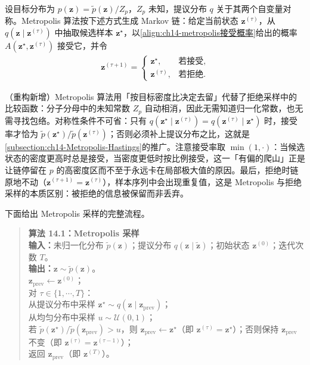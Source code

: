 \documentclass[../../main.tex]{subfiles}
\begin{document}
\begin{definition}[Metropolis 算法]\label{definition:ch14-Metropolis算法}
设目标分布为 $p(\bm{z})=\widetilde{p}(\bm{z})/Z_{p}$，$Z_{p}$ 未知，提议分布 $q$ 关于其两个自变量对称。Metropolis 算法按下述方式生成 Markov 链：给定当前状态 $\bm{z}^{(\tau)}$，从 $q\!\left(\bm{z}\mid\bm{z}^{(\tau)}\right)$ 中抽取候选样本 $\bm{z}^{\star}$，以\eqref{align:ch14-metropolis接受概率}给出的概率 $A\!\left(\bm{z}^{\star},\bm{z}^{(\tau)}\right)$ 接受它，并令
\begin{align*}
\bm{z}^{(\tau+1)}=\begin{cases}\bm{z}^{\star}, & \text{若接受},\\ \bm{z}^{(\tau)}, & \text{若拒绝}.\end{cases}
\end{align*}
\end{definition}

\begin{remark}（重构新增）Metropolis 算法用「按目标密度比决定去留」代替了拒绝采样中的比较函数：分子分母中的未知常数 $Z_{p}$ 自动相消，因此无需知道归一化常数，也无需寻找包络。对称性条件不可省：只有 $q\!\left(\bm{z}^{\star}\mid\bm{z}^{(\tau)}\right)=q\!\left(\bm{z}^{(\tau)}\mid\bm{z}^{\star}\right)$ 时，接受率才恰为 $\widetilde{p}(\bm{z}^{\star})/\widetilde{p}(\bm{z}^{(\tau)})$；否则必须补上提议分布之比，这就是\cref{subsection:ch14-Metropolis-Hastings}的推广。注意接受率取 $\min(1,\cdot)$：当候选状态的密度更高时总是接受，当密度更低时按比例接受，这一「有偏的爬山」正是让链停留在 $p$ 的高密度区而不至于永远卡在局部极大值的原因。最后，拒绝时链原地不动（$\bm{z}^{(\tau+1)}=\bm{z}^{(\tau)}$），样本序列中会出现重复值，这是 Metropolis 与拒绝采样的本质区别：被拒绝的信息被保留而非丢弃。
\end{remark}

下面给出 Metropolis 采样的完整流程。

\begin{quote}
\small
\textbf{算法 14.1：Metropolis 采样}\\
\textbf{输入：}未归一化分布 $\widetilde{p}(\bm{z})$；提议分布 $q\!\left(\bm{z}\mid\widetilde{\bm{z}}\right)$；初始状态 $\bm{z}^{(0)}$；迭代次数 $T$。\\
\textbf{输出：}$\bm{z}\sim\widetilde{p}(\bm{z})$。\\
$\bm{z}_{\mathrm{prev}}\leftarrow\bm{z}^{(0)}$；\\
对 $\tau\in\{1,\cdots,T\}$：\\
\quad 从提议分布中采样 $\bm{z}^{\star}\sim q\!\left(\bm{z}\mid\bm{z}_{\mathrm{prev}}\right)$；\\
\quad 从均匀分布中采样 $u\sim\mathcal{U}(0,1)$；\\
\quad 若 $\widetilde{p}\!\left(\bm{z}^{\star}\right)/\widetilde{p}\!\left(\bm{z}_{\mathrm{prev}}\right)>u$，则 $\bm{z}_{\mathrm{prev}}\leftarrow\bm{z}^{\star}$（即 $\bm{z}^{(\tau)}=\bm{z}^{\star}$）；否则保持 $\bm{z}_{\mathrm{prev}}$ 不变（即 $\bm{z}^{(\tau)}=\bm{z}^{(\tau-1)}$）；\\
返回 $\bm{z}_{\mathrm{prev}}$（即 $\bm{z}^{(T)}$）。
\end{quote}
\end{document}
